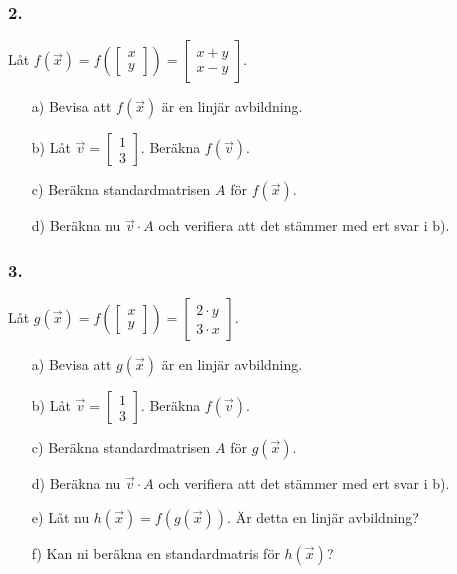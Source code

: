 \documentclass{article}
\begin{document}
\subsubsection*{2.}
Låt $f(\vec{x}) = f(\begin{bmatrix}x \\ y\end{bmatrix}) = \begin{bmatrix}x + y \\ x - y\end{bmatrix}$. 
\begin{itemize}
	\item[a) ] Bevisa att $f(\vec{x})$ är en linjär avbildning.
	\item[b) ] Låt $\vec{v} = \begin{bmatrix}1 \\ 3\end{bmatrix}$. Beräkna $f(\vec{v})$. 
	\item[c) ] Beräkna standardmatrisen $A$ för $f(\vec{x})$. 
	\item[d) ] Beräkna nu $\vec{v} \cdot A$ och verifiera att det stämmer med ert svar i b). 
\end{itemize}

\subsubsection*{3.}
Låt $g(\vec{x}) = f(\begin{bmatrix}x \\ y\end{bmatrix}) = \begin{bmatrix}2 \cdot y \\ 3 \cdot x\end{bmatrix}$.
\begin{itemize} 
	\item[a) ] Bevisa att $g(\vec{x})$ är en linjär avbildning.
	\item[b) ] Låt $\vec{v} = \begin{bmatrix}1 \\ 3\end{bmatrix}$. Beräkna $f(\vec{v})$. 
	\item[c) ] Beräkna standardmatrisen $A$ för $g(\vec{x})$. 
	\item[d) ] Beräkna nu $\vec{v} \cdot A$ och verifiera att det stämmer med ert svar i b). 
	\item[e) ] Låt nu $h(\vec{x}) = f(g(\vec{x})).$ Är detta en linjär avbildning?
	\item[f) ] Kan ni beräkna en standardmatris för $h(\vec{x})$?
\end{itemize}
\end{document}
